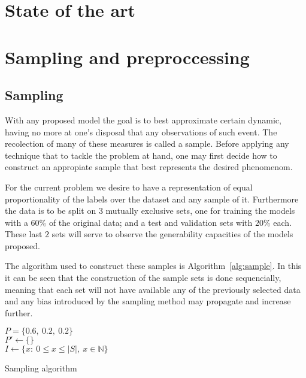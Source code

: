 \documentclass[journal]{IEEEtran}
\begin{document}
\section{State of the art\label{sec:state_of_art}}


\section{Sampling and preproccessing\label{sec:premodel}}
\subsection{Sampling\label{sec:sample}}

With any proposed model the goal is to best approximate certain dynamic, having
no more at one's disposal that any observations of such event. The recolection
of many of these measures is called a sample. Before applying any technique that
to tackle the problem at hand, one may first decide how to construct an
appropiate sample that best represents the desired phenomenom.

For the current problem we desire to have a representation of equal
proportionality of the labels over the dataset and any sample of it. Furthermore
the data is to be split on $3$ mutually exclusive sets, one for training the
models with a $60\%$ of the original data; and a test and validation sets with
$20\%$ each. These last $2$ sets will serve to observe the generability
capacities of the models proposed.

The algorithm used to construct these samples is Algorithm~\ref{alg:sample}. In
this it can be seen that the construction of the sample sets is done
sequencially, meaning that each set will not have available any of the
previously selected data and any bias introduced by the sampling method may
propagate and increase further.

\begin{algorithm}[ht]
    $P = \{0.6,\ 0.2,\ 0.2\}$\\
    $P' \gets \{\}$\\
    $I \gets \{x:\ 0\leq x\leq \lvert S\rvert,\ x\in\mathbb{N}\}$\\
     \caption{Sampling algorithm\label{alg:sample}}
\end{algorithm}
\end{document}
